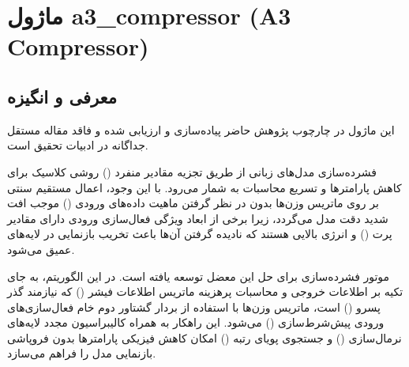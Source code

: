 \section{ماژول a3\_compressor (A3 Compressor)}
\label{sec:module_a3_compressor}

\subsection{معرفی و انگیزه}
این ماژول در چارچوب پژوهش حاضر پیاده‌سازی و ارزیابی شده و فاقد مقاله مستقل جداگانه در ادبیات تحقیق است.

فشرده‌سازی مدل‌های زبانی از طریق تجزیه مقادیر منفرد () روشی کلاسیک برای کاهش پارامترها و تسریع محاسبات به شمار می‌رود. با این وجود، اعمال مستقیم  سنتی بر روی ماتریس وزن‌ها بدون در نظر گرفتن ماهیت داده‌های ورودی () موجب افت شدید دقت مدل می‌گردد، زیرا برخی از ابعاد ویژگی فعال‌سازی ورودی دارای مقادیر پرت () و انرژی بالایی هستند که نادیده گرفتن آن‌ها باعث تخریب بازنمایی در لایه‌های عمیق می‌شود.

موتور فشرده‌سازی  برای حل این معضل توسعه یافته است. در این الگوریتم، به جای تکیه بر اطلاعات خروجی و محاسبات پرهزینه ماتریس اطلاعات فیشر () که نیازمند گذر پسرو () است، ماتریس وزن‌ها با استفاده از بردار گشتاور دوم خام فعال‌سازی‌های ورودی پیش‌شرط‌سازی () می‌شود. این راهکار به همراه کالیبراسیون مجدد لایه‌های نرمال‌سازی () و جستجوی پویای رتبه () امکان کاهش فیزیکی پارامترها بدون فروپاشی بازنمایی مدل را فراهم می‌سازد.

